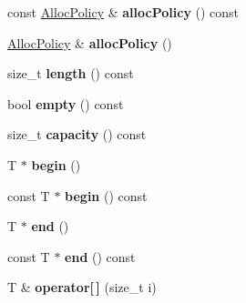 \begin{DoxyCompactItemize}
\item 
\hypertarget{classjs_1_1_vector_aef924f26c8d1857acf40d3aed7341275}{const \hyperlink{class_alloc_policy}{Alloc\-Policy} \& {\bfseries alloc\-Policy} () const }\label{classjs_1_1_vector_aef924f26c8d1857acf40d3aed7341275}

\item 
\hypertarget{classjs_1_1_vector_ab84d4645107b3f10c987f8f1bbba2371}{\hyperlink{class_alloc_policy}{Alloc\-Policy} \& {\bfseries alloc\-Policy} ()}\label{classjs_1_1_vector_ab84d4645107b3f10c987f8f1bbba2371}

\item 
\hypertarget{classjs_1_1_vector_a36d862370dce43281c541b842f20b009}{size\-\_\-t {\bfseries length} () const }\label{classjs_1_1_vector_a36d862370dce43281c541b842f20b009}

\item 
\hypertarget{classjs_1_1_vector_a413c3cdb80d72484fc2d5a8c2740f0c1}{bool {\bfseries empty} () const }\label{classjs_1_1_vector_a413c3cdb80d72484fc2d5a8c2740f0c1}

\item 
\hypertarget{classjs_1_1_vector_af989d8d525038c98eeabb4147f353e35}{size\-\_\-t {\bfseries capacity} () const }\label{classjs_1_1_vector_af989d8d525038c98eeabb4147f353e35}

\item 
\hypertarget{classjs_1_1_vector_a26a8efd9470e24c75e9776d5819b1476}{T $\ast$ {\bfseries begin} ()}\label{classjs_1_1_vector_a26a8efd9470e24c75e9776d5819b1476}

\item 
\hypertarget{classjs_1_1_vector_a47eaeb8efb888458f1e5d2f0be324bd9}{const T $\ast$ {\bfseries begin} () const }\label{classjs_1_1_vector_a47eaeb8efb888458f1e5d2f0be324bd9}

\item 
\hypertarget{classjs_1_1_vector_a372381fc9bdcccd29940a782402cf1f9}{T $\ast$ {\bfseries end} ()}\label{classjs_1_1_vector_a372381fc9bdcccd29940a782402cf1f9}

\item 
\hypertarget{classjs_1_1_vector_a77f60b63474d82969b8ab395c27ff2ae}{const T $\ast$ {\bfseries end} () const }\label{classjs_1_1_vector_a77f60b63474d82969b8ab395c27ff2ae}

\item 
\hypertarget{classjs_1_1_vector_a820f141cc552175beb200d1d57145e73}{T \& {\bfseries operator\mbox{[}$\,$\mbox{]}} (size\-\_\-t i)}\label{classjs_1_1_vector_a820f141cc552175beb200d1d57145e73}


\end{DoxyCompactItemize}
